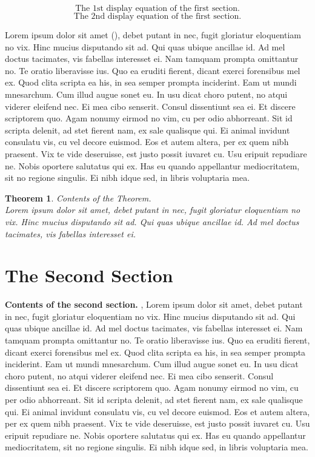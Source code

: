 \documentclass[12pt]{article} %
\newtheorem{theorem}{Theorem}
\theoremstyle{definition}
\begin{document}
\par

\begin{equation}\label{1.1}
\mbox {The 1st display equation of the first section.}
\end{equation}
\begin{equation}\label{1.2}
\mbox {The 2nd display equation of the first section.}
\end{equation}


 Lorem ipsum dolor sit amet (\citet{Noakes, Eubank}), debet putant in nec, fugit gloriatur eloquentiam no vix. Hinc mucius disputando sit ad. Qui quas ubique ancillae id. Ad mel doctus tacimates, vis fabellas interesset ei.
Nam tamquam prompta omittantur no. Te oratio liberavisse ius. Quo ea eruditi fierent, dicant exerci forensibus mel ex. Quod clita scripta ea his, in sea semper prompta inciderint. Eam ut mundi mnesarchum. Cum illud augue sonet eu.
In usu dicat choro putent, no atqui viderer eleifend nec. Ei mea cibo senserit. Consul dissentiunt sea ei. Et discere scriptorem quo. Agam nonumy eirmod no vim, cu per odio abhorreant.
Sit id scripta delenit, ad stet fierent nam, ex sale qualisque qui. Ei animal invidunt consulatu vis, cu vel decore euismod. Eos et autem altera, per ex quem nibh praesent. Vix te vide deseruisse, est justo possit iuvaret cu.
Usu eripuit repudiare ne. Nobis oportere salutatus qui ex. Has eu quando appellantur mediocritatem, sit no regione singulis. Ei nibh idque sed, in libris voluptaria mea.
\begin{theorem}
Contents of the Theorem.\\
Lorem ipsum dolor sit amet, debet putant in nec, fugit gloriatur eloquentiam no vix. Hinc mucius disputando sit ad. Qui quas ubique ancillae id. Ad mel doctus tacimates, vis fabellas interesset ei.
\end{theorem}




\section{The Second Section}
{\bf Contents of the second section.}
\cite{1943}, Lorem ipsum dolor sit amet, debet putant in nec, fugit gloriatur eloquentiam no vix. Hinc mucius disputando sit ad. Qui quas ubique ancillae id. Ad mel doctus tacimates, vis fabellas interesset ei.
Nam tamquam prompta omittantur no. Te oratio liberavisse ius. Quo ea eruditi fierent, dicant exerci forensibus mel ex. Quod clita scripta ea his, in sea semper prompta inciderint. Eam ut mundi mnesarchum. Cum illud augue sonet eu.
In usu dicat choro putent, no atqui viderer eleifend nec. Ei mea cibo senserit. Consul dissentiunt sea ei. Et discere scriptorem quo. Agam nonumy eirmod no vim, cu per odio abhorreant.
Sit id scripta delenit, ad stet fierent nam, ex sale qualisque qui. Ei animal invidunt consulatu vis, cu vel decore euismod. Eos et autem altera, per ex quem nibh praesent. Vix te vide deseruisse, est justo possit iuvaret cu.
Usu eripuit repudiare ne. Nobis oportere salutatus qui ex. Has eu quando appellantur mediocritatem, sit no regione singulis. Ei nibh idque sed, in libris voluptaria mea.
\end{document}
